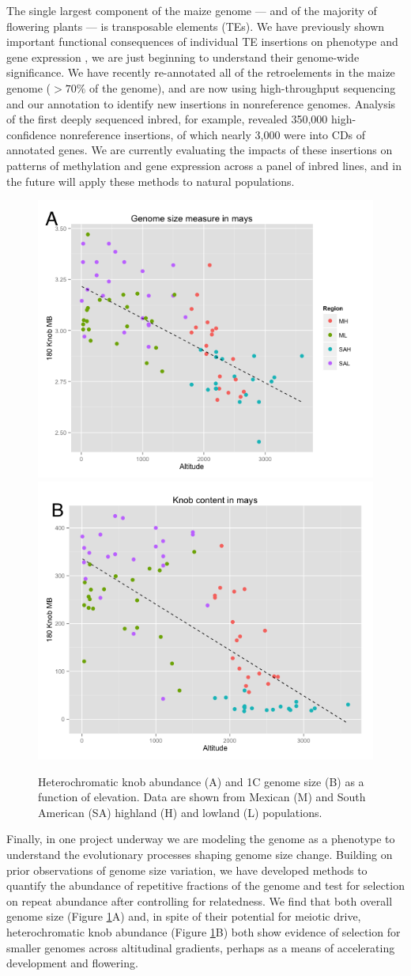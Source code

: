\documentclass[11pt,letterpaper]{article}
\begin{document}
The single largest component of the maize genome --- and of the majority of flowering plants --- is transposable elements (TEs). 
We have previously shown important functional consequences of individual TE insertions on phenotype and gene expression \cite{studer2011identification,makarevitch2015transposable}, we are just beginning to understand their genome-wide significance.
We have recently re-annotated all of the retroelements in the maize genome ($>70\%$ of the genome), and are now using high-throughput sequencing and our annotation to identify new insertions in nonreference genomes. 
Analysis of the first deeply sequenced inbred, for example, revealed 350,000 high-confidence nonreference insertions, of which nearly 3,000 were into CDs of annotated genes.
We are currently evaluating the impacts of these insertions on patterns of methylation and gene expression across a panel of inbred lines, and in the future will apply these methods to natural populations.

\begin{figure}[]
\centering
\includegraphics[width=.45\textwidth]{figs/gsjeff} 
\includegraphics[width=.45\textwidth]{figs/knobjeff}
\caption{Heterochromatic knob abundance (A) and 1C genome size (B) as a function of elevation. Data are shown from Mexican (M) and South American (SA) highland (H) and lowland (L) populations.
\label{fig:gsize}}
\end{figure}

Finally, in one project underway we are modeling the genome as a phenotype to understand the evolutionary processes shaping genome size change.
Building on prior observations of genome size variation, we have developed methods to quantify the abundance of repetitive fractions of the genome and test for selection on repeat abundance after controlling for relatedness. 
We find that both overall genome size (Figure \ref{fig:gsize}A) and, in spite of their potential for meiotic drive, heterochromatic knob abundance (Figure \ref{fig:gsize}B) both show evidence of selection for smaller genomes across altitudinal gradients, perhaps as a means of accelerating development and flowering.
\end{document}
